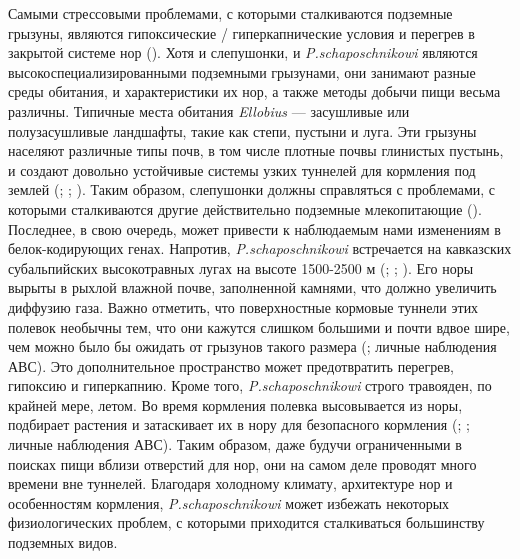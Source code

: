  Самыми стрессовыми проблемами, с которыми сталкиваются подземные грызуны, являются гипоксические / гиперкапнические условия и перегрев в закрытой системе нор (\cite{Lacey2000}). Хотя и слепушонки, и \textit{P.schaposchnikowi} являются высокоспециализированными подземными грызунами, они занимают разные среды обитания, и характеристики их нор, а также методы добычи пищи весьма различны. Типичные места обитания \textit{Ellobius} --- засушливые или полузасушливые ландшафты, такие как степи, пустыни и луга. Эти грызуны населяют различные типы почв, в том числе плотные почвы глинистых пустынь, и создают довольно устойчивые системы узких туннелей для кормления под землей (\cite{Ognev1950}; \cite{Gromov1977}; \cite{Shubin1978}). Таким образом, слепушонки должны справляться с проблемами, с которыми сталкиваются другие действительно подземные млекопитающие (\cite{Lacey2000}). Последнее, в свою очередь, может привести к наблюдаемым нами изменениям в белок-кодирующих генах. Напротив, \textit{P.schaposchnikowi} встречается на кавказских субальпийских высокотравных лугах на высоте 1500-2500 м (\cite{Vereshchagin1959}; \cite{Vorontsov1966}; \cite{Krystufek2005}). Его норы вырыты в рыхлой влажной почве, заполненной камнями, что должно увеличить диффузию газа. Важно отметить, что поверхностные кормовые туннели этих полевок необычны тем, что они кажутся слишком большими и почти вдвое шире, чем можно было бы ожидать от грызунов такого размера (\cite{Vorontsov1966}; личные наблюдения АВС). Это дополнительное пространство может предотвратить перегрев, гипоксию и гиперкапнию. Кроме того, \textit{P.schaposchnikowi} строго травояден, по крайней мере, летом. Во время кормления полевка высовывается из норы, подбирает растения и затаскивает их в нору для безопасного кормления (\cite{Gambaryan1957}; \cite{Zimina1977}; личные наблюдения АВС). Таким образом, даже будучи ограниченными в поисках пищи вблизи отверстий для нор, они на самом деле проводят много времени вне туннелей. Благодаря холодному климату, архитектуре нор и особенностям кормления, \textit{P.schaposchnikowi} может избежать некоторых физиологических проблем, с которыми приходится сталкиваться большинству подземных видов.

